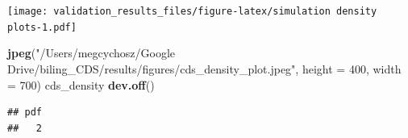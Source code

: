 \documentclass[
]{article}
\newenvironment{Shaded}{\begin{snugshade}}{\end{snugshade}}
\newcommand{\DataTypeTok}[1]{\textcolor[rgb]{0.13,0.29,0.53}{#1}}
\newcommand{\DecValTok}[1]{\textcolor[rgb]{0.00,0.00,0.81}{#1}}
\newcommand{\KeywordTok}[1]{\textcolor[rgb]{0.13,0.29,0.53}{\textbf{#1}}}
\newcommand{\NormalTok}[1]{#1}
\newcommand{\StringTok}[1]{\textcolor[rgb]{0.31,0.60,0.02}{#1}}
\begin{document}
\texttt{[image: validation\_results\_files/figure-latex/simulation density plots-1.pdf]}

\begin{Shaded}
\begin{Highlighting}[]
\KeywordTok{jpeg}\NormalTok{(}\StringTok{"/Users/megcychosz/Google Drive/biling_CDS/results/figures/cds_density_plot.jpeg"}\NormalTok{, }\DataTypeTok{height =} \DecValTok{400}\NormalTok{, }\DataTypeTok{width =} \DecValTok{700}\NormalTok{)}
\NormalTok{cds_density}
\KeywordTok{dev.off}\NormalTok{()}
\end{Highlighting}
\end{Shaded}

\begin{verbatim}
## pdf 
##   2
\end{verbatim}
\end{document}
